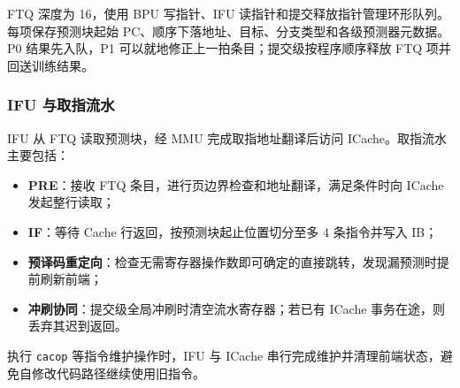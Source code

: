 FTQ 深度为 16，使用 BPU 写指针、IFU 读指针和提交释放指针管理环形队列。每项保存预测块起始 PC、顺序下落地址、目标、分支类型和各级预测器元数据。P0 结果先入队，P1 可以就地修正上一拍条目；提交级按程序顺序释放 FTQ 项并回送训练结果。

\subsubsection{IFU 与取指流水}

IFU 从 FTQ 读取预测块，经 MMU 完成取指地址翻译后访问 ICache。取指流水主要包括：
\begin{itemize}
  \item \textbf{PRE}：接收 FTQ 条目，进行页边界检查和地址翻译，满足条件时向 ICache 发起整行读取；
  \item \textbf{IF}：等待 Cache 行返回，按预测块起止位置切分至多 4 条指令并写入 IB；
  \item \textbf{预译码重定向}：检查无需寄存器操作数即可确定的直接跳转，发现漏预测时提前刷新前端；
  \item \textbf{冲刷协同}：提交级全局冲刷时清空流水寄存器；若已有 ICache 事务在途，则丢弃其迟到返回。
\end{itemize}

执行 \texttt{cacop} 等指令维护操作时，IFU 与 ICache 串行完成维护并清理前端状态，避免自修改代码路径继续使用旧指令。

